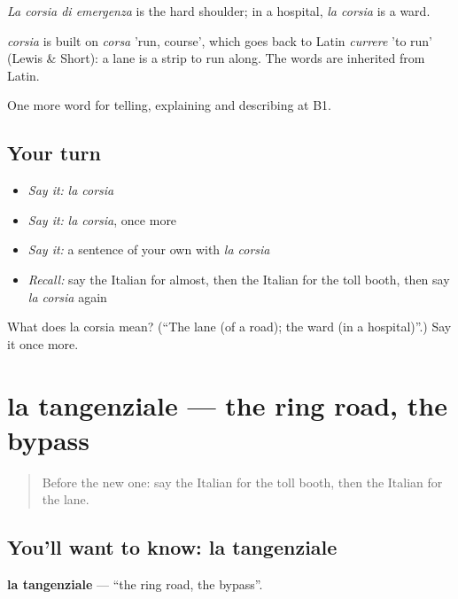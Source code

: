 \emph{La corsia di emergenza} is the hard shoulder; in a hospital, \emph{la corsia} is a ward.

\begin{cousinweb}
\emph{corsia} is built on \emph{corsa} 'run, course', which goes back to Latin \emph{currere} 'to run' (Lewis \& Short): a lane is a strip to run along. The words are inherited from Latin.
\end{cousinweb}

\begin{grammarlens}[title={What you've built}]
One more word for telling, explaining and describing at B1.
\end{grammarlens}

\subsection*{Your turn}
\begin{itemize}
\raggedright
  \item \emph{Say it:} \emph{la corsia}
  \item \emph{Say it:} \emph{la corsia}, once more
  \item \emph{Say it:} a sentence of your own with \emph{la corsia}
  \item \emph{Recall:} say the Italian for almost, then the Italian for the toll booth, then say \emph{la corsia} again
\end{itemize}

\begin{tcolorbox}[breakable,colback=teal!4,colframe=teal!35!black,title={Before you move on}]
What does la corsia mean? (\textquotedblleft{}The lane (of a road); the ward (in a hospital)\textquotedblright{}.) Say it once more.
\end{tcolorbox}
\section[la tangenziale]{la tangenziale — the ring road, the bypass}

\label{lesson:IT-C405-tangenziale}



\begin{quote}
Before the new one: say the Italian for the toll booth, then the Italian for the lane.
\end{quote}

\subsection*{You'll want to know: la tangenziale}
\textbf{la tangenziale} — \textquotedblleft{}the ring road, the bypass\textquotedblright{}.

